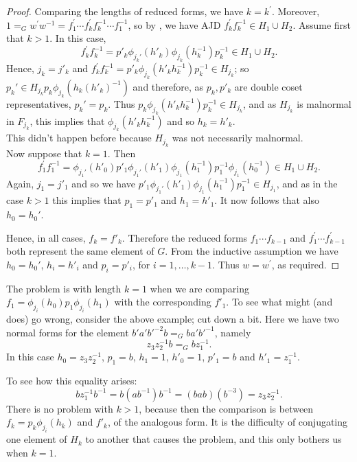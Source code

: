 \documentclass[a4paper,12pt]{article}
\numberwithin{equation}{section}
\numberwithin{figure}{section}
\newenvironment{ajd1}{\noindent\color{red} AJD }{}
\newcommand{\ajd}[1]{\begin{ajd1} #1 \end{ajd1}}
\begin{document}
\begin{proof}
Comparing the lengths of reduced forms, we have $k=k^\prime$.
Moreover, $1=_G w^\prime w^{-1}= f_1^\prime \cdots f_{k}^\prime
f_k^{-1}\cdots f_1^{-1}$, so by \cite[Chapter IV, Theorem 2.6]{LS}, 
we have \ajd{$ f_{k}^\prime f_k^{-1}\in H_{1}\cup H_2$.
Assume first that $k>1$. 
In this case, 
\[ f_{k}^\prime f_k^{-1}= p'_k\phi_{j_k'}(h'_k)\phi_{j_k}(h_k^{-1})p_k^{-1}\in H_1\cup H_2.\] 
 Hence, $j_k=j'_k$ and 
$f_{k}^\prime f_k^{-1}=
p'_k\phi_{j_k}(h'_k h_k^{-1})p_k^{-1}\in H_{j_k}$; 
so $p_k'\in H_{j_k}p_k\phi_{j_k}(h_k (h'_k)^{-1})$ and therefore, as 
$p_k, p'_k$ are  double coset representatives,  
$p_k'=p_k$. 
Thus $p_k\phi_{j_k}(h'_k h_k^{-1})p_k^{-1}\in H_{j_k}$, and as 
$H_{j_k}$ is malnormal in $F_{j_k}$, this implies that
$\phi_{j_k}(h'_k h_k^{-1})$ and so $h_k=h'_k$.\\
This didn't happen before because $H_{j_k}$ was not 
necessarily malnormal.\\
Now suppose that $k=1$. Then 
\[
f_{1}^\prime f_1^{-1}=\phi_{j_1'}(h'_0) p'_1\phi_{j_1'}(h'_1)
\phi_{j_1}(h_1^{-1})p_1^{-1}\phi_{j_1}(h_0^{-1})\in H_1\cup H_2.
\] 
Again, $j_1=j'_1$ and so we
 have $p'_1\phi_{j_1'}(h'_1)\phi_{j_1}(h_1^{-1})p_1^{-1}
\in H_{j_1}$, 
and as in the case $k>1$ this implies that $p_1=p'_1$ and 
$h_1=h'_1$. It now follows that also $h_0=h_0'$. 
 
Hence, in all cases, $f_k=f'_k$. 
Therefore the reduced forms 
$f_1\cdots f_{k-1}$ and 
$f_1^\prime \cdots f_{k-1}^\prime$ both represent the same 
element of $G$. From the inductive assumption we have 
$h_0=h_0'$,  $h_i=h'_i$ and $p_i=p'_i$, for $i=1,\ldots, k-1$. 
Thus }
   $w=w^\prime$, as required.
\end{proof}

The problem is with length $k=1$ when we are comparing 
$f_1=\phi_{j_i}(h_0)p_1\phi_{j_i}(h_1)$ with the corresponding $f'_1$. 
To see what might (and does) go wrong, consider the above example; cut down
a bit. 
Here we have two normal forms for the element
 $b'a'b'^{-2}b=_Gba'b'^{-1}$, namely
\[z_3z_2^{-1}b=_G bz_1^{-1}.\]
In this case $h_0=z_3z_2^{-1}$, $p_1=b$, $h_1=1$, $h'_0=1$, $p'_1=b$ and 
$h'_1=z_1^{-1}$. 

To see how this equality arises:
\[bz_1^{-1}b^{-1}=b(ab^{-1})b^{-1}=(bab)(b^{-3})=z_3z_2^{-1}.\]
There is no problem with $k>1$, because then the comparison is between
$f_k=p_k\phi_{j_i}(h_k)$ and $f'_k$, of the analogous form. It is the 
difficulty of conjugating one element of $H_k$ to another that causes
the problem, and this only bothers us when $k=1$. 
\end{document}
